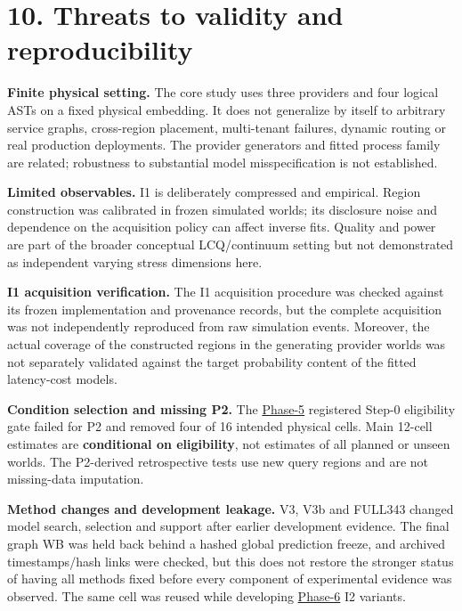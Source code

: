\documentclass[10pt,a4paper]{article}
\begin{document}
\section*{10. Threats to validity and reproducibility}

\textbf{Finite physical setting.} The core study uses three providers and four logical ASTs on a fixed physical embedding. It does not generalize by itself to arbitrary service graphs, cross-region placement, multi-tenant failures, dynamic routing or real production deployments. The provider generators and fitted process family are related; robustness to substantial model misspecification is not established.

\textbf{Limited observables.} I1 is deliberately compressed and empirical. Region construction was calibrated in frozen simulated worlds; its disclosure noise and dependence on the acquisition policy can affect inverse fits. Quality and power are part of the broader conceptual LCQ/continuum setting but not demonstrated as independent varying stress dimensions here.

\textbf{I1 acquisition verification.} The I1 acquisition procedure was checked against its frozen implementation and provenance records, but the complete acquisition was not independently reproduced from raw simulation events. Moreover, the actual coverage of the constructed regions in the generating provider worlds was not separately validated against the target probability content of the fitted latency-cost models.

\textbf{Condition selection and missing P2.} The \hyperref[app:experiment-stages]{Phase-5} registered Step-0 eligibility gate failed for P2 and removed four of 16 intended physical cells. Main 12-cell estimates are \textbf{conditional on eligibility}, not estimates of all planned or unseen worlds. The P2-derived retrospective tests use new query regions and are not missing-data imputation.

\textbf{Method changes and development leakage.} V3, V3b and FULL343 changed model search, selection and support after earlier development evidence. The final graph WB was held back behind a hashed global prediction freeze, and archived timestamps/hash links were checked, but this does not restore the stronger status of having all methods fixed before every component of experimental evidence was observed. The same cell was reused while developing \hyperref[app:experiment-stages]{Phase-6} I2 variants.
\end{document}
